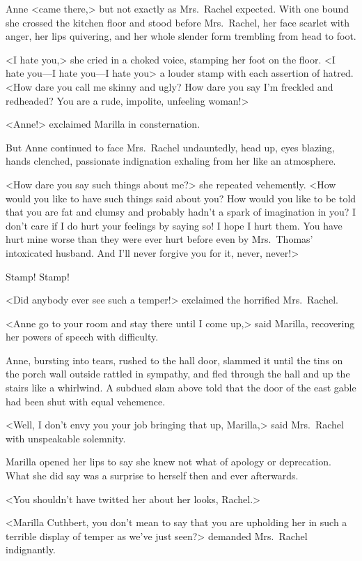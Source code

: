 Anne <came there,> but not exactly as Mrs.~Rachel expected. With one bound she crossed the kitchen floor and stood before Mrs.~Rachel, her face scarlet with anger, her lips quivering, and her whole slender form trembling from head to foot.

<I hate you,> she cried in a choked voice, stamping her foot on the floor. <I hate you—I hate you—I hate you\longdash> a louder stamp with each assertion of hatred. <How dare you call me skinny and ugly? How dare you say I'm freckled and redheaded? You are a rude, impolite, unfeeling woman!>

<Anne!> exclaimed Marilla in consternation.

But Anne continued to face Mrs.~Rachel undauntedly, head up, eyes blazing, hands clenched, passionate indignation exhaling from her like an atmosphere.

<How dare you say such things about me?> she repeated vehemently. <How would you like to have such things said about you? How would you like to be told that you are fat and clumsy and probably hadn't a spark of imagination in you? I don't care if I do hurt your feelings by saying so! I hope I hurt them. You have hurt mine worse than they were ever hurt before even by Mrs.~Thomas' intoxicated husband. And I'll never forgive you for it, never, never!>

Stamp! Stamp!

<Did anybody ever see such a temper!> exclaimed the horrified Mrs.~Rachel.

<Anne go to your room and stay there until I come up,> said Marilla, recovering her powers of speech with difficulty.

Anne, bursting into tears, rushed to the hall door, slammed it until the tins on the porch wall outside rattled in sympathy, and fled through the hall and up the stairs like a whirlwind. A subdued slam above told that the door of the east gable had been shut with equal vehemence.

<Well, I don't envy you your job bringing that up, Marilla,> said Mrs.~Rachel with unspeakable solemnity.

Marilla opened her lips to say she knew not what of apology or deprecation. What she did say was a surprise to herself then and ever afterwards.

<You shouldn't have twitted her about her looks, Rachel.>

<Marilla Cuthbert, you don't mean to say that you are upholding her in such a terrible display of temper as we've just seen?> demanded Mrs.~Rachel indignantly.

